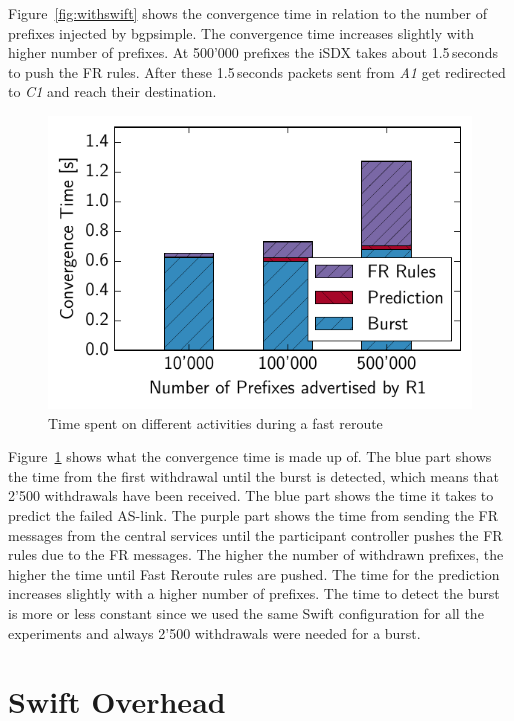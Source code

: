 Figure~\ref{fig:withswift} shows the convergence time in relation to the number of prefixes injected by bgpsimple.
The convergence time increases slightly with higher number of prefixes. At 500'000 prefixes the iSDX takes about 1.5\,seconds to push the FR rules. After these 1.5\,seconds packets sent from \emph{A1} get redirected to \emph{C1} and reach their destination. 

\begin{figure}[h]
\center
\includegraphics[scale = 1]{Figures/barplot.pdf}
\caption{Time spent on different activities during a fast reroute}
\label{fig:activities}
\end{figure}

Figure~\ref{fig:activities} shows what the convergence time is made up of. The blue part shows the time from the first withdrawal until the burst is detected, which means that 2'500 withdrawals have been received. The blue part shows the time it takes to predict the failed AS-link. The purple part shows the time from sending the FR messages from the central services until the participant controller pushes the FR rules due to the FR messages. The higher the number of withdrawn prefixes, the higher the time until Fast Reroute rules are pushed. The time for the prediction increases slightly with a higher number of prefixes. The time to detect the burst is more or less constant since we used the same Swift configuration for all the experiments and always 2'500 withdrawals were needed for a burst. 

\section{\label{chapter5:Swift overhead}Swift Overhead}

